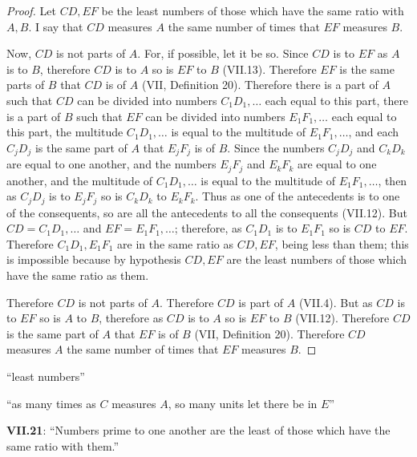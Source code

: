 \documentclass{article}
\begin{document}
\begin{proof}
Let $CD,EF$ be the least numbers of those which have the same ratio with $A,B$. I say that $CD$ measures $A$ the same number of times that $EF$ measures $B$.

Now, $CD$ is not parts of $A$. For, if possible, let it be so. Since $CD$ is to $EF$ as $A$ is to $B$, therefore $CD$ is to $A$ so is $EF$ to $B$ (VII.13). 
Therefore $EF$ is the same parts of $B$ that $CD$ is of $A$ (VII, Definition 20).
Therefore there is a part of $A$ such that $CD$ can be divided into numbers $C_1D_1,\ldots$ each equal to this part, 
there is a part of $B$ such that $EF$ can be divided into numbers $E_1F_1,\ldots$ each equal to this part, the multitude 
$C_1D_1,\ldots$ is equal to the multitude of $E_1F_1,\ldots$, and each $C_jD_j$ is the same part of $A$ that $E_jF_j$ is of $B$.
Since the numbers $C_jD_j$ and $C_kD_k$ are equal to one another,
and the numbers $E_jF_j$ and $E_kF_k$ are equal to one another, 
and the multitude of $C_1D_1,\ldots$ is equal to the multitude of $E_1F_1,\ldots$,
then as $C_jD_j$ is to $E_jF_j$ so is $C_kD_k$ to $E_kF_k$. 
Thus as one of the antecedents is to one of the consequents, so are all the antecedents to all
the consequents (VII.12). But $CD=C_1D_1,\ldots$ and $EF=E_1F_1,\ldots$;
therefore, as $C_1D_1$ is to $E_1F_1$ so is $CD$ to $EF$. 
Therefore $C_1D_1,E_1F_1$ are in the same ratio as
$CD,EF$, being less than them; this is impossible because by hypothesis $CD,EF$ are the least numbers
of those which have the same ratio as them.

Therefore $CD$ is not parts of $A$. Therefore $CD$ is part of $A$ (VII.4). But 
as $CD$ is to $EF$ so is $A$ to $B$, therefore
as $CD$ is to $A$ so is $EF$ to $B$ (VII.12).  
Therefore $CD$ is the same part of $A$ that $EF$ is of $B$ (VII, Definition 20).
Therefore $CD$ measures $A$ the same number of times that $EF$ measures $B$.  
\end{proof}


``least numbers'' 

``as many times as $C$ measures $A$, so many units let there be in $E$''

\textbf{VII.21}: ``Numbers prime to one another are the least of those which have the same ratio with them.''
\end{document}
